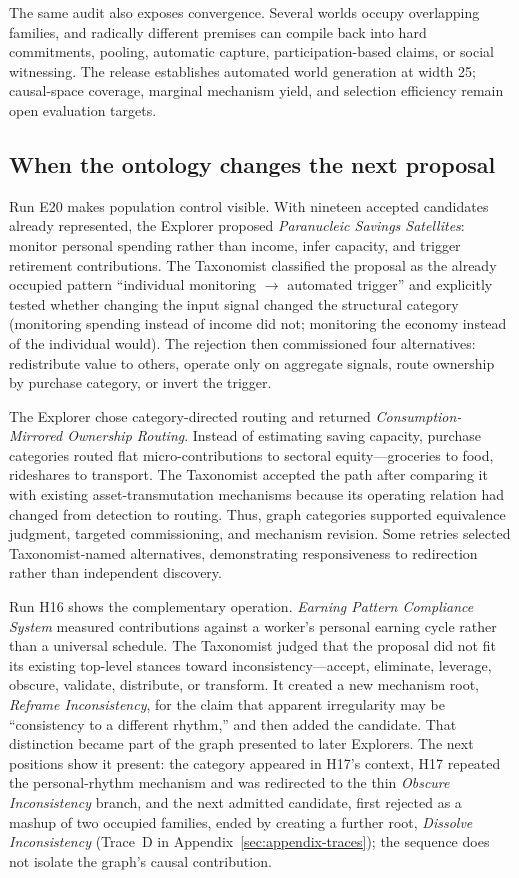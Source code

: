 \documentclass[11pt,a4paper]{article}
\begin{document}
The same audit also exposes convergence. Several worlds occupy overlapping families, and radically different premises can compile back into hard commitments, pooling, automatic capture, participation-based claims, or social witnessing. The release establishes automated world generation at width 25; causal-space coverage, marginal mechanism yield, and selection efficiency remain open evaluation targets.

\subsection{When the ontology changes the next proposal}
\label{sec:redirect}

Run E20 makes population control visible. With nineteen accepted candidates already represented, the Explorer proposed \emph{Paranucleic Savings Satellites}: monitor personal spending rather than income, infer capacity, and trigger retirement contributions. The Taxonomist classified the proposal as the already occupied pattern ``individual monitoring $\rightarrow$ automated trigger'' and explicitly tested whether changing the input signal changed the structural category (monitoring spending instead of income did not; monitoring the economy instead of the individual would). The rejection then commissioned four alternatives: redistribute value to others, operate only on aggregate signals, route ownership by purchase category, or invert the trigger.

The Explorer chose category-directed routing and returned \emph{Consumption-Mirrored Ownership Routing}. Instead of estimating saving capacity, purchase categories routed flat micro-contributions to sectoral equity---groceries to food, rideshares to transport. The Taxonomist accepted the path after comparing it with existing asset-transmutation mechanisms because its operating relation had changed from detection to routing. Thus, graph categories supported equivalence judgment, targeted commissioning, and mechanism revision. Some retries selected Taxonomist-named alternatives, demonstrating responsiveness to redirection rather than independent discovery.

Run H16 shows the complementary operation. \emph{Earning Pattern Compliance System} measured contributions against a worker's personal earning cycle rather than a universal schedule. The Taxonomist judged that the proposal did not fit its existing top-level stances toward inconsistency---accept, eliminate, leverage, obscure, validate, distribute, or transform. It created a new mechanism root, \emph{Reframe Inconsistency}, for the claim that apparent irregularity may be ``consistency to a different rhythm,'' and then added the candidate. That distinction became part of the graph presented to later Explorers. The next positions show it present: the category appeared in H17's context, H17 repeated the personal-rhythm mechanism and was redirected to the thin \emph{Obscure Inconsistency} branch, and the next admitted candidate, first rejected as a mashup of two occupied families, ended by creating a further root, \emph{Dissolve Inconsistency} (Trace~D in Appendix~\ref{sec:appendix-traces}); the sequence does not isolate the graph's causal contribution.
\end{document}
